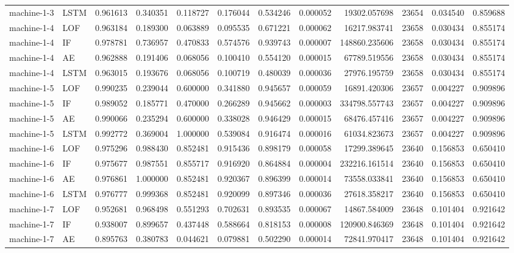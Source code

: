 \begin{longtable}{llrrrrrrrrrr}
machine-1-3 & LSTM & 0.961613 & 0.340351 & 0.118727 & 0.176044 & 0.534246 & 0.000052 & 19302.057698 & 23654 & 0.034540 & 0.859688 \\
machine-1-4 & LOF & 0.963184 & 0.189300 & 0.063889 & 0.095535 & 0.671221 & 0.000062 & 16217.983741 & 23658 & 0.030434 & 0.855174 \\
machine-1-4 & IF & 0.978781 & 0.736957 & 0.470833 & 0.574576 & 0.939743 & 0.000007 & 148860.235606 & 23658 & 0.030434 & 0.855174 \\
machine-1-4 & AE & 0.962888 & 0.191406 & 0.068056 & 0.100410 & 0.554120 & 0.000015 & 67789.519556 & 23658 & 0.030434 & 0.855174 \\
machine-1-4 & LSTM & 0.963015 & 0.193676 & 0.068056 & 0.100719 & 0.480039 & 0.000036 & 27976.195759 & 23658 & 0.030434 & 0.855174 \\
machine-1-5 & LOF & 0.990235 & 0.239044 & 0.600000 & 0.341880 & 0.945657 & 0.000059 & 16891.420306 & 23657 & 0.004227 & 0.909896 \\
machine-1-5 & IF & 0.989052 & 0.185771 & 0.470000 & 0.266289 & 0.945662 & 0.000003 & 334798.557743 & 23657 & 0.004227 & 0.909896 \\
machine-1-5 & AE & 0.990066 & 0.235294 & 0.600000 & 0.338028 & 0.946429 & 0.000015 & 68476.457416 & 23657 & 0.004227 & 0.909896 \\
machine-1-5 & LSTM & 0.992772 & 0.369004 & 1.000000 & 0.539084 & 0.916474 & 0.000016 & 61034.823673 & 23657 & 0.004227 & 0.909896 \\
machine-1-6 & LOF & 0.975296 & 0.988430 & 0.852481 & 0.915436 & 0.898179 & 0.000058 & 17299.389645 & 23640 & 0.156853 & 0.650410 \\
machine-1-6 & IF & 0.975677 & 0.987551 & 0.855717 & 0.916920 & 0.864884 & 0.000004 & 232216.161514 & 23640 & 0.156853 & 0.650410 \\
machine-1-6 & AE & 0.976861 & 1.000000 & 0.852481 & 0.920367 & 0.896399 & 0.000014 & 73558.033841 & 23640 & 0.156853 & 0.650410 \\
machine-1-6 & LSTM & 0.976777 & 0.999368 & 0.852481 & 0.920099 & 0.897346 & 0.000036 & 27618.358217 & 23640 & 0.156853 & 0.650410 \\
machine-1-7 & LOF & 0.952681 & 0.968498 & 0.551293 & 0.702631 & 0.893535 & 0.000067 & 14867.584009 & 23648 & 0.101404 & 0.921642 \\
machine-1-7 & IF & 0.938007 & 0.899657 & 0.437448 & 0.588664 & 0.818153 & 0.000008 & 120900.846369 & 23648 & 0.101404 & 0.921642 \\
machine-1-7 & AE & 0.895763 & 0.380783 & 0.044621 & 0.079881 & 0.502290 & 0.000014 & 72841.970417 & 23648 & 0.101404 & 0.921642 \\

\end{longtable}

